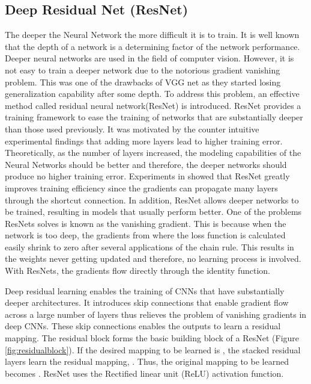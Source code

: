 \documentclass[a4paper]{article}
\begin{document}
\subsection{Deep Residual Net (ResNet)}
    The deeper the Neural Network the more difficult it is to train. It is well known that the depth of a network is a determining factor of the network performance. Deeper neural networks are used in the field of computer vision. However, it is not easy to train a deeper network due to the notorious gradient vanishing problem. This was one of the drawbacks of VGG net \cite{vggnet} as they started losing generalization capability after some depth. To address this problem, an effective method called residual neural network(ResNet)\cite{resnet} is introduced. ResNet provides a training framework to ease the training of networks that are substantially deeper than those used previously. It was motivated by the counter intuitive experimental findings that adding more layers lead to higher training error. Theoretically, as the number of layers increased, the modeling capabilities of the Neural Networks should be better and therefore, the deeper networks should produce no higher training error. Experiments in \cite{resnet} showed that ResNet greatly improves training efficiency since the gradients can propagate many layers through the shortcut connection. In addition, ResNet allows deeper networks to be trained, resulting in models that usually perform better.
One of the problems ResNets solves is known as the vanishing gradient. This is because when the network is too deep, the gradients from where the loss function is calculated easily shrink to zero after several applications of the chain rule. This results in the weights never getting updated and therefore, no learning process is involved. With ResNets, the gradients flow directly through the identity function.
    
    Deep residual learning \cite{resnet} enables the training of CNNs that have substantially deeper architectures. It introduces skip connections that enable gradient flow across a large number of layers thus relieves the problem of vanishing gradients in deep CNNs. These skip connections enables the outputs to learn a residual mapping. The residual block forms the basic building block of a ResNet (Figure \ref{fig:residualblock}). If the desired mapping to be learned is , the stacked residual layers learn the residual mapping, . Thus, the original mapping to be learned becomes .  ResNet uses the Rectified linear unit (ReLU) activation function.
    
\end{document}
